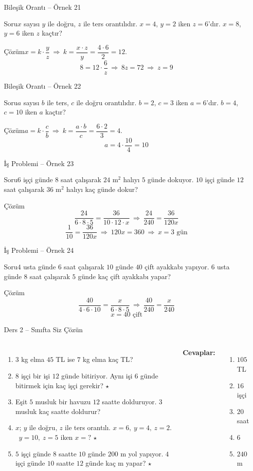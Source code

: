 \documentclass[aspectratio=169,11pt]{beamer}
\newcommand{\soru}[3]{%
\begin{frame}{#1}
  \begin{block}{Soru}\large #2\end{block}
  \pause
  \begin{exampleblock}{Çözüm}\large #3\end{exampleblock}
\end{frame}}
\begin{document}
\soru{Bileşik Orantı -- Örnek 21}
{\(x\) sayısı \(y\) ile doğru, \(z\) ile ters orantılıdır. \(x=4\), \(y=2\) iken \(z=6\)'dır. \(x=8\), \(y=6\) iken \(z\) kaçtır?}
{\(x=k\cdot\dfrac{y}{z}\ \Rightarrow\ k=\dfrac{x\cdot z}{y}=\dfrac{4\cdot 6}{2}=12\).
\[8=12\cdot\frac{6}{z}\ \Rightarrow\ 8z=72\ \Rightarrow\ z=9\]}

\soru{Bileşik Orantı -- Örnek 22}
{\(a\) sayısı \(b\) ile ters, \(c\) ile doğru orantılıdır. \(b=2\), \(c=3\) iken \(a=6\)'dır. \(b=4\), \(c=10\) iken \(a\) kaçtır?}
{\(a=k\cdot\dfrac{c}{b}\ \Rightarrow\ k=\dfrac{a\cdot b}{c}=\dfrac{6\cdot 2}{3}=4\).
\[a=4\cdot\frac{10}{4}=10\]}

\soru{İş Problemi -- Örnek 23}
{\(6\) işçi günde \(8\) saat çalışarak \(24\) m\(^2\) halıyı \(5\) günde dokuyor. \(10\) işçi günde \(12\) saat çalışarak \(36\) m\(^2\) halıyı kaç günde dokur?}
{\[\frac{24}{6\cdot 8\cdot 5}=\frac{36}{10\cdot 12\cdot x}\ \Rightarrow\ \frac{24}{240}=\frac{36}{120x}\]
\[\frac{1}{10}=\frac{36}{120x}\ \Rightarrow\ 120x=360\ \Rightarrow\ x=3\text{ gün}\]}

\soru{İş Problemi -- Örnek 24}
{\(4\) usta günde \(6\) saat çalışarak \(10\) günde \(40\) çift ayakkabı yapıyor. \(6\) usta günde \(8\) saat çalışarak \(5\) günde kaç çift ayakkabı yapar?}
{\[\frac{40}{4\cdot 6\cdot 10}=\frac{x}{6\cdot 8\cdot 5}\ \Rightarrow\ \frac{40}{240}=\frac{x}{240}\]
\[x=40\text{ çift}\]}

\begin{frame}{Ders 2 -- Sınıfta Siz Çözün}
\begin{columns}[t]
\begin{enumerate}
\item \(3\) kg elma \(45\) TL ise \(7\) kg elma kaç TL?
\item \(8\) işçi bir işi \(12\) günde bitiriyor. Aynı işi \(6\) günde bitirmek için kaç işçi gerekir? \(\star\)
\item Eşit \(5\) musluk bir havuzu \(12\) saatte dolduruyor. \(3\) musluk kaç saatte doldurur?
\item \(x\); \(y\) ile doğru, \(z\) ile ters orantılı. \(x=6,\ y=4,\ z=2\). \ \(y=10,\ z=5\) iken \(x=?\) \(\star\)
\item \(5\) işçi günde \(8\) saatte \(10\) günde \(200\) m yol yapıyor. \(4\) işçi günde \(10\) saatte \(12\) günde kaç m yapar? \(\star\)
\end{enumerate}
\pause
\textbf{Cevaplar:}
\begin{enumerate}
\item \(105\) TL
\item \(16\) işçi
\item \(20\) saat
\item \(6\)
\item \(240\) m
\end{enumerate}
\end{columns}
\vspace{4pt}{\footnotesize \(\star\) işaretli soruların adım adım çözümü sonraki slaytlardadır.}
\end{frame}
\end{document}
